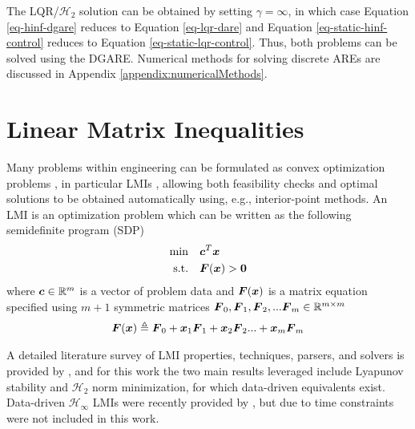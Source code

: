 The LQR/$\mathcal{H}_{2}$ solution can be obtained by setting $\gamma = \infty$, in which case Equation \eqref{eq-hinf-dgare} reduces to Equation \eqref{eq-lqr-dare} and Equation \eqref{eq-static-hinf-control} reduces to Equation \eqref{eq-static-lqr-control}.  Thus, both problems can be solved using the DGARE.  Numerical methods for solving discrete AREs are discussed in Appendix \ref{appendix:numericalMethods}.

\section{Linear Matrix Inequalities}
Many problems within engineering can be formulated as convex optimization problems \cite{boyd1990linear, boyd1994linear, balakrishnan1995connections, skogestad2005multivariable, liu2017survey}, in particular LMIs \cite{caverly2019lmi}, allowing both feasibility checks and optimal solutions to be obtained automatically using, e.g., interior-point methods.  An LMI is an optimization problem which can be written as the following semidefinite program (SDP)
\begin{equation}
\label{eq-generic-sdp}
\begin{aligned}
	\min \quad & \vb*{c}^{T}\vb*{x}\\
	\textrm{s.t.} \quad & \vb*{F}(\vb*{x}) > \vb*{0}\\
\end{aligned}
\end{equation}
where $\vb*{c} \in \mathbb{R}^{m}$ is a vector of problem data and $\vb*{F}(\vb*{x})$ is a matrix equation specified using $m+1$ symmetric matrices $\vb*{F}_{0}, \vb*{F}_{1}, \vb*{F}_{2}, ... \vb*{F}_{m} \in \mathbb{R}^{m \times m}$
\begin{equation}
\begin{aligned}
	\vb*{F}(\vb*{x}) \triangleq \vb*{F}_{0} + \vb*{x}_{1}\vb*{F}_{1} + \vb*{x}_{2}\vb*{F}_{2} ... + \vb*{x}_{m}\vb*{F}_{m}
\end{aligned}
\end{equation}

A detailed literature survey of LMI properties, techniques, parsers, and solvers is provided by \cite{caverly2019lmi}, and for this work the two main results leveraged include Lyapunov stability and $\mathcal{H}_{2}$ norm minimization, for which data-driven equivalents exist.  Data-driven $\mathcal{H}_{\infty}$ LMIs were recently provided by \cite{berberich2020robust, berberich2022combining}, but due to time constraints were not included in this work.

